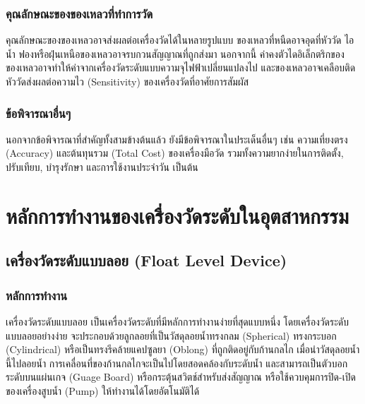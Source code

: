 \documentclass[final,11pt,a4paper]{article}
\begin{document}
\subsubsection{คุณลักษณะของของเหลวที่ทำการวัด}
คุณลักษณะของของเหลวอาจส่งผลต่อเครื่องวัดได้ในหลายรูปแบบ ของเหลวที่หนืดอาจอุดที่หัววัด ไอน้ำ ฟองหรือฝุ่นเหนือของเหลวอาจรบกวนสัญญาณที่ถูกส่งมา 
นอกจากนี้ ค่าคงตัวไดอิเล็กตริกของของเหลวอาจทำให้ค่าจากเครื่องวัดระดับแบบความจุไฟฟ้าเปลี่ยนแปลงไป
และของเหลวอาจเคลือบติดหัววัดส่งผลต่อความไว (Sensitivity) ของเครื่องวัดที่อาศัยการสัมผัส 
\subsubsection{ข้อพิจารณาอื่นๆ} นอกจากข้อพิจารณาที่สำคัญทั้งสามข้างต้นแล้ว ยังมีข้อพิจารณาในประเด็นอื่นๆ เช่น 
ความเที่ยงตรง (Accuracy) และต้นทุนรวม (Total Cost) ของเครื่องมือวัด รวมทั้งความยากง่ายในการติดตั้ง, ปรับเทียบ, บำรุงรักษา 
และการใช้งานประจำวัน เป็นต้น

\newpage
\section{หลักการทำงานของเครื่องวัดระดับในอุตสาหกรรม}
\subsection{เครื่องวัดระดับแบบลอย (Float Level Device)}
\subsubsection{หลักการทำงาน} 
เครื่องวัดระดับแบบลอย เป็นเครื่องวัดระดับที่มีหลักการทำงานง่ายที่สุดแบบหนึ่ง
โดยเครื่องวัดระดับแบบลอยอย่างง่าย จะประกอบด้วยลูกลอยที่เป็นวัสดุลอยน้ำทรงกลม (Spherical) ทรงกระบอก (Cylindrical)
หรือเป็นทรงรีคล้ายแคปซูลยา (Oblong) ที่ถูกติดอยู่กับก้านกลไก เมื่อนำวัสดุลอยน้ำนี้ไปลอยน้ำ การเคลื่อนที่ของก้านกลไกจะเป็นไปโดยสอดคล้องกับระดับน้ำ
และสามารถเป็นตัวบอกระดับบนแผ่นเกจ (Guage Board) หรือกระตุ้นสวิตช์สำหรับส่งสัญญาณ หรือใช้ควบคุมการปิด-เปิดของเครื่องสูบน้ำ (Pump) ให้ทำงานได้โดยอัตโนมัติได้  
\end{document}
